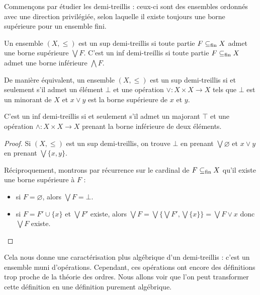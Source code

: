 Commençons par étudier les demi-treillis : ceux-ci sont des ensembles ordonnés
avec une direction privilégiée, selon laquelle il existe toujours une borne
supérieure pour un ensemble fini.

\begin{definition}
  Un ensemble $(X,\leq)$ est un sup demi-treillis si toute partie $F\subseteq_{\mathrm{fin}} X$
  admet une borne supérieure $\bigvee F$. C'est un inf demi-treillis si toute
  partie $F\subseteq_{\mathrm{fin}} X$ admet une borne inférieure $\bigwedge F$.
\end{definition}

\begin{property}
  De manière équivalent, un ensemble $(X,\leq)$ est un sup demi-treillis si et
  seulement s'il admet un élément $\bot$ et une opération
  $\lor : X \times X \to X$ tels que $\bot$ est un minorant de $X$ et
  $x\lor y$ est la borne supérieure de $x$ et $y$.

  C'est un inf demi-treillis si et seulement s'il admet un majorant $\top$ et
  une opération $\land : X \times X \to X$ prenant la borne inférieure de deux
  éléments.
\end{property}

\begin{proof}
  Si $(X,\leq)$ est un sup demi-treillis, on trouve $\bot$ en prenant
  $\bigvee\varnothing$ et $x\lor y$ en prenant $\bigvee\{x,y\}$.

  Réciproquement, montrons par récurrence sur le cardinal de $F\subseteq_{\mathrm{fin}} X$ qu'il
  existe une borne supérieure à $F$ :
  \begin{itemize}
  \item si $F = \varnothing$, alors $\bigvee F = \bot$.
  \item si $F = F' \cup \{x\}$ et $\bigvee F'$ existe, alors
    $\bigvee F = \bigvee \{\bigvee F',\bigvee \{x\}\} = \bigvee F \lor x$
    donc $\bigvee F$ existe.
  \end{itemize}
\end{proof}

Cela nous donne une caractérisation plus algébrique d'un demi-treillis : c'est un
ensemble muni d'opérations. Cependant, ces opérations ont encore des définitions
trop proche de la théorie des ordres. Nous allons voir que l'on peut transformer
cette définition en une définition purement algébrique.

